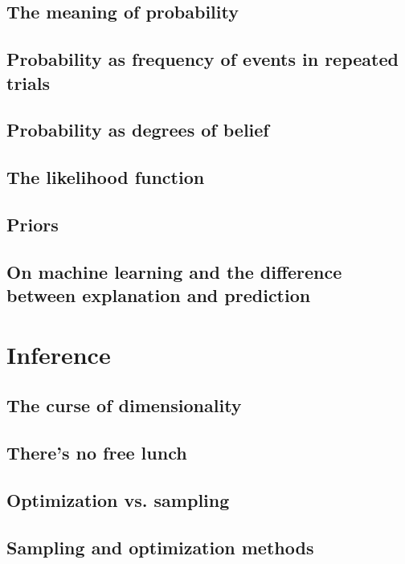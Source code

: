 \documentclass[11pt]{report}
\begin{document}
\subsection{The meaning of probability}
\subsection{Probability as frequency of events in repeated trials}
\subsection{Probability as degrees of belief}
\subsection{The likelihood function}
\subsection{Priors}
\subsection{On machine learning and the difference between explanation and prediction}

\section{Inference}
\label{sec:inference}
\subsection{The curse of dimensionality}
\subsection{There's no free lunch}
\subsection{Optimization vs. sampling}
\subsection{Sampling and optimization methods}
\end{document}
